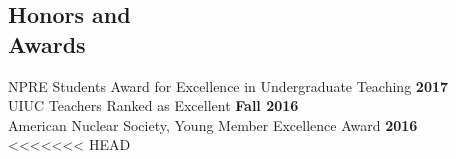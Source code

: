 \documentclass[margin,line]{resume}
\begin{document}
\begin{resume}
    \section{\mysidestyle Honors and\\Awards}
                NPRE Students Award for Excellence in Undergraduate Teaching \hfill \textbf{2017}\vspace{.5mm}\\%
                UIUC Teachers Ranked as Excellent \hfill \textbf{Fall 2016}\vspace{.5mm}\\%
                American Nuclear Society, Young Member Excellence Award                         \hfill \textbf{2016}\vspace{.5mm}\\%
<<<<<<< HEAD
%
%

\end{resume}
\end{document}
